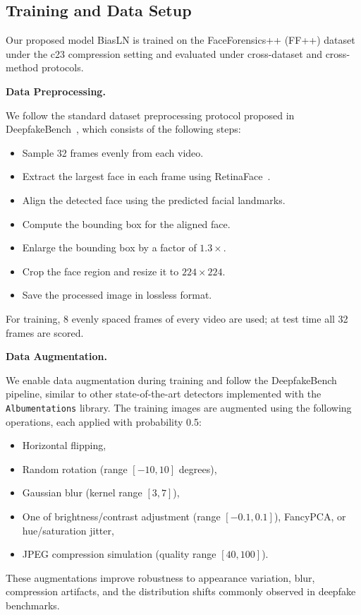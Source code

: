 \documentclass[fonts]{icst}
\newif\ifrevmark\revmarkfalse
\newcommand{\rev}[1]{\ifrevmark{\color{revblue}#1}\else#1\fi}
\begin{document}
\subsection{Training and Data Setup}
\label{sec:impl}

Our proposed model BiasLN is trained on the FaceForensics++ (FF++) dataset under the c23 compression setting and evaluated under cross-dataset and cross-method protocols.

\noindent\textbf{Data Preprocessing.}\par
We follow the standard dataset preprocessing protocol proposed in DeepfakeBench~\cite{yan2023deepfakebench}, which consists of the following steps:
\begin{itemize}[leftmargin=*, topsep=2pt, itemsep=2pt, label=--]
    \item Sample 32 frames evenly from each video.
    \item Extract the largest face in each frame using RetinaFace~\cite{deng2020retinaface}.
    \item Align the detected face using the predicted facial landmarks.
    \item Compute the bounding box for the aligned face.
    \item Enlarge the bounding box by a factor of $1.3\times$.
    \item Crop the face region and resize it to $224 \times 224$.
    \item Save the processed image in lossless format.
\end{itemize}
\rev{For training, 8 evenly spaced frames of every video are used; at test time all 32 frames are scored.}

\noindent\textbf{Data Augmentation.}\par
We enable data augmentation during training and follow the DeepfakeBench~\cite{yan2023deepfakebench} pipeline, similar to other state-of-the-art detectors implemented with the \texttt{Albumentations} library.
The training images are augmented using \rev{the following operations, each applied with probability 0.5}:
\begin{itemize}[leftmargin=*, topsep=2pt, itemsep=2pt, label=--]
    \item Horizontal flipping,
    \item Random rotation (range $[-10, 10]$ degrees),
    \item Gaussian blur (kernel range $[3, 7]$),
    \item \rev{One of} brightness/contrast adjustment (range $[-0.1, 0.1]$)\rev{, FancyPCA, or hue/saturation jitter},
    \item JPEG compression simulation (quality range $[40, 100]$).
\end{itemize}
These augmentations improve robustness to appearance variation, blur, compression artifacts, and the distribution shifts commonly observed in deepfake benchmarks.
\end{document}
